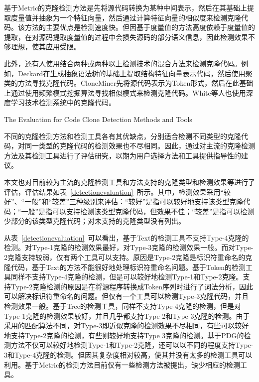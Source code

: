 基于Metric的克隆检测方法是先将源代码转换为某种中间表示，然后在其基础上提取度量值并抽象为一个特征向量，然后通过计算特征向量的相似度来检测克隆代码。该方法的主要优点是检测速度快。但因基于度量值的方法高度依赖于度量值的提取，在对源码提取度量值的过程中会损失源码的部分语义信息，因此检测效果不够理想，使其应用受限。

此外，还有人使用结合两种或两种以上检测技术的混合方法来检测克隆代码。例如，Deckard在生成抽象语法树的基础上提取结构特征向量表示代码，然后使用聚类的方法寻找克隆代码\cite{jiang2007deckard}。CloneMiner先将源代码表示为Token形式，然后在此基础上通过使用频繁模式挖掘算法寻找相似模式来检测克隆代码\cite{basit2009data}。White等人也使用深度学习技术检测系统中的克隆代码\cite{white2016deep}。


{The Evaluation for Code Clone Detection Methods and Tools}

不同的克隆检测方法和检测工具各有其优缺点，分别适合检测不同类型的克隆代码，对同一类型的克隆代码的检测效果也不尽相同。因此，通过对主流的克隆检测方法及其检测工具进行了评估研究，以期为用户选择方法和工具提供指导性的建议\cite{bellon2007comparison}\cite{rattan2013software}\cite{roy2009comparison}\cite{svajlenko2014evaluating}。%

本文也对目前较为主流的克隆检测工具和方法支持的克隆类型和检测效果等进行了评估，评估结果如表~\ref{detectionevaluation}~所示。其中，检测效果采用“较好”、“一般”和“较差”三种级别来评估：“较好”是指可以较好地支持该类型克隆代码；“一般”是指可以支持检测该类型克隆代码，但效果不佳；“较差”是指可以检测少部分的该类型克隆代码；对未支持的克隆类型没有列出。

从表~\ref{detectionevaluation}~可以看出，基于Text的检测工具不支持Type-4克隆的检测。对Type-1克隆的检测效果最好，对Type-3克隆的检测效果一般。而对Type-2克隆支持较弱，仅有两个工具可以支持。原因是Type-2克隆是标识符重命名的克隆代码，基于Text的方法不能很好地处理标识符重命名问题。基于Token的检测工具同样不支持Type-4克隆的检测，但是可以较好地检测Type-1和Type-2克隆。支持Type-2克隆检测的原因是在将源程序转换成Token序列时进行了词法分析，因此可以解决标识符重命名的问题。但仅有一个工具可以检测Type-3克隆代码，并且检测效果一般。基于Tree的检测工具，同样不支持Type-4克隆的检测，但是对Type-1克隆的检测效果较好，并且几乎都支持Type-2和Type-3克隆的检测。由于采用的匹配算法不同，对Type-3即近似克隆的检测效果不尽相同，有些可以较好地支持Type-2克隆的检测，有些则较好地支持Type 3克隆的检测。基于PDG的检测方法不仅可以较好地检测Type-1和Type-2克隆，还可以以不同的程度支持Type-3和Type-4克隆的检测。但因其复杂度相对较高，使其并没有太多的检测工具可以利用。基于Metric的检测方法目前仅有一些检测方法被提出\cite{kontogiannis1996pattern}\cite{mayrand1996experiment}，缺少相应的检测工具。

